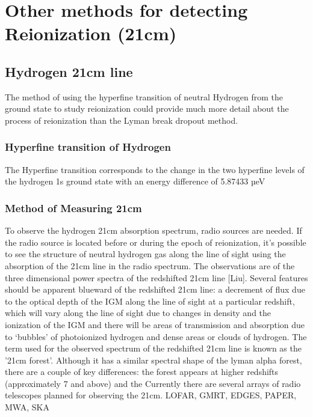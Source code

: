 
\section{Other methods for detecting Reionization (21cm)} %
\label{sec:other_methods21cm}

    \subsection{Hydrogen 21cm line} %
    \label{sub:Hydrogen_21cm}

The method of using the hyperfine transition of neutral Hydrogen from the ground state to study reionization could provide much more detail about the process of reionization than the Lyman break dropout method.

         \subsubsection{Hyperfine transition of Hydrogen} %
         \label{subsub:Hyperfine_Hydrogen}

The Hyperfine transition corresponds to the change in the two hyperfine levels of the hydrogen 1s ground state with an energy difference of 5.87433 µeV
    
	
         \subsubsection{Method of Measuring 21cm} %
	\label{subsub:Measuring_21cm} 

To observe the hydrogen 21cm absorption spectrum, radio sources are needed. If the radio source is located before or during the epoch of reionization, it’s possible to see the structure of neutral hydrogen gas along the line of sight using the absorption of the 21cm line in the radio spectrum. The observations are of the three dimensional power spectra of the redshifted  21cm line [Liu].  Several features should be apparent blueward of the redshifted 21cm line: a decrement of flux due to the optical depth of the IGM along the line of sight at a particular redshift, which will vary along the line of sight due to changes in density and the ionization of the IGM and there will be areas of transmission and absorption due to ‘bubbles’ of photoionized hydrogen and dense areas or clouds of hydrogen. The term used for the observed spectrum of the redshifted 21cm line is known as the '21cm forest'. Although it has a similar spectral shape of the lyman alpha forest, there are a couple of key differences: the forest appears at higher redshifts (approximately 7 and above) and  the   Currently there are several arrays of radio telescopes planned for observing the 21cm. LOFAR, GMRT, EDGES, PAPER, MWA, SKA

